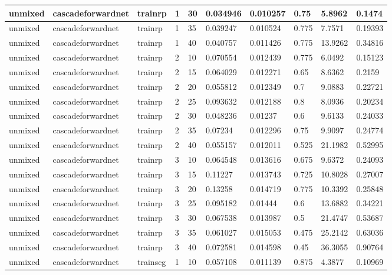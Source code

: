\begin{longtable}{lllllllll}
unmixed & cascadeforwardnet & trainrp & 1 & 30 & 0.034946 & 0.010257 & 0.75 & 5.8962 & 0.1474 \\ \hline 
unmixed & cascadeforwardnet & trainrp & 1 & 35 & 0.039247 & 0.010524 & 0.775 & 7.7571 & 0.19393 \\ \hline 
unmixed & cascadeforwardnet & trainrp & 1 & 40 & 0.040757 & 0.011426 & 0.775 & 13.9262 & 0.34816 \\ \hline 
unmixed & cascadeforwardnet & trainrp & 2 & 10 & 0.070554 & 0.012439 & 0.775 & 6.0492 & 0.15123 \\ \hline 
unmixed & cascadeforwardnet & trainrp & 2 & 15 & 0.064029 & 0.012271 & 0.65 & 8.6362 & 0.2159 \\ \hline 
unmixed & cascadeforwardnet & trainrp & 2 & 20 & 0.055812 & 0.012349 & 0.7 & 9.0883 & 0.22721 \\ \hline 
unmixed & cascadeforwardnet & trainrp & 2 & 25 & 0.093632 & 0.012188 & 0.8 & 8.0936 & 0.20234 \\ \hline 
unmixed & cascadeforwardnet & trainrp & 2 & 30 & 0.048236 & 0.01237 & 0.6 & 9.6133 & 0.24033 \\ \hline 
unmixed & cascadeforwardnet & trainrp & 2 & 35 & 0.07234 & 0.012296 & 0.75 & 9.9097 & 0.24774 \\ \hline 
unmixed & cascadeforwardnet & trainrp & 2 & 40 & 0.055157 & 0.012011 & 0.525 & 21.1982 & 0.52995 \\ \hline 
unmixed & cascadeforwardnet & trainrp & 3 & 10 & 0.064548 & 0.013616 & 0.675 & 9.6372 & 0.24093 \\ \hline 
unmixed & cascadeforwardnet & trainrp & 3 & 15 & 0.11227 & 0.013743 & 0.725 & 10.8028 & 0.27007 \\ \hline 
unmixed & cascadeforwardnet & trainrp & 3 & 20 & 0.13258 & 0.014719 & 0.775 & 10.3392 & 0.25848 \\ \hline 
unmixed & cascadeforwardnet & trainrp & 3 & 25 & 0.095182 & 0.01444 & 0.6 & 13.6882 & 0.34221 \\ \hline 
unmixed & cascadeforwardnet & trainrp & 3 & 30 & 0.067538 & 0.013987 & 0.5 & 21.4747 & 0.53687 \\ \hline 
unmixed & cascadeforwardnet & trainrp & 3 & 35 & 0.061027 & 0.015053 & 0.475 & 25.2142 & 0.63036 \\ \hline 
unmixed & cascadeforwardnet & trainrp & 3 & 40 & 0.072581 & 0.014598 & 0.45 & 36.3055 & 0.90764 \\ \hline 
unmixed & cascadeforwardnet & trainscg & 1 & 10 & 0.057108 & 0.011139 & 0.875 & 4.3877 & 0.10969 \\ \hline 

\end{longtable}
